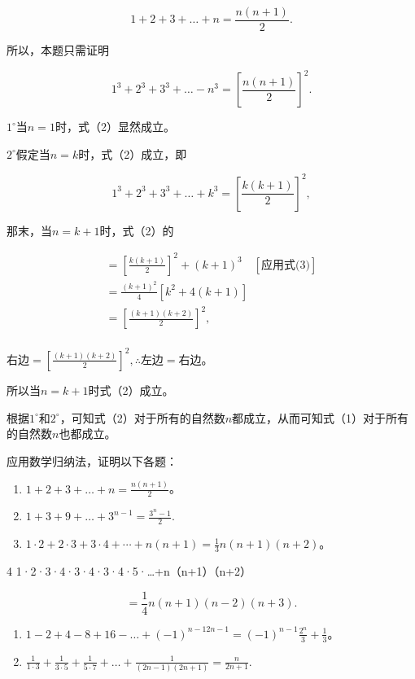 \[
1 + 2 + 3 + \dots + n = \frac{n (n + 1)}{2}.
\]

所以，本题只需证明

\[
1^{3} + 2^{3} + 3^{3} + \dots - n^{3} = \left[ \frac{n (n + 1)}{2} \right]^{2}. \tag {2}
\]

\(1^{\circ}\)当\(n = 1\)时，式（2）显然成立。

\(2^{\circ}\)假定当\(n = k\)时，式（2）成立，即

\[
1^{3} + 2^{3} + 3^{3} + \dots + k^{3} = \left[ \frac{k (k + 1)}{2} \right]^{2}, \tag {3}
\]

那末，当\(n = k + 1\)时，式（2）的

\[
\begin{array}{l} = \left[ \frac{k (k + 1)}{2} \right]^{2} + (k + 1)^{3} \quad [ \text{应用式(3)} ] \\ = \frac{(k + 1)^{2}}{4} [ k^{2} + 4 (k + 1) ] \\ = \left[ \frac{(k + 1) (k + 2)}{2} \right]^{2}, \\ \end{array}
\]

右边\(= \left[\frac{(k + 1)(k + 2)}{2}\right]^2, \therefore\)左边\(=\)右边。

所以当\(n = k + 1\)时式（2）成立。

根据\(1^{\circ}\)和\(2^{\circ}\)，可知式（2）对于所有的自然数\(n\)都成立，从而可知式（1）对于所有的自然数\(n\)也都成立。

应用数学归纳法，证明以下各题：

\begin{enumerate}[start=1]
\item
  \(1 + 2 + 3 + \dots + n = \frac{n(n + 1)}{2}\)。
\item
  \(1 + 3 + 9 + \dots +3^{n - 1} = \frac{3^n - 1}{2}.\)
\item
  \(1 \cdot 2 + 2 \cdot 3 + 3 \cdot 4 + \cdots + n(n + 1) = \frac{1}{3} n(n + 1)(n + 2)\)。
\end{enumerate}

4 1·2·3·4·3·4·3·4·5·\ldots+n（n+1）（n+2）

\[
= \frac{1}{4} n (n + 1) (n - 2) (n + 3).
\]

\begin{enumerate}[start=5]
\item
  \(1 - 2 + 4 - 8 + 16 - \dots + (-1)^{n - 12n - 1} = (-1)^{n - 1}\frac{2^n}{3} + \frac{1}{3}\)。
\item
  \(\frac{1}{1\cdot 3} +\frac{1}{3\cdot 5} +\frac{1}{5\cdot 7} +\dots +\frac{1}{(2n - 1)(2n + 1)} = \frac{n}{2n + 1}.\)
\end{enumerate}

